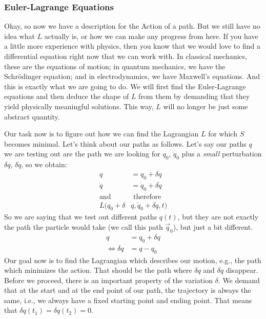 \documentclass{article}
\begin{document}
	\subsubsection{Euler-Lagrange Equations}
	Okay, so now we have a description for the Action of a path. But we still have no idea what $L$ actually is, or how we can make any progress from here. If you have a little more experience with physics, then you know that we would love to find a differential equation right now that we can work with. In classical mechanics, these are the equations of motion; in quantum mechanics, we have the Schrödinger equation; and in electrodynamics, we have Maxwell's equations. And this is exactly what we are going to do. We will first find the Euler-Lagrange equations and then deduce the shape of $L$ from them by demanding that they yield physically meaningful solutions. This way, $L$ will no longer be just some abstract quantity.
	
	Our task now is to figure out how we can find the Lagrangian $L$ for which $S$ becomes minimal. 
	Let's think about our paths as follows. Let's say our paths $q$ we are testing out are the path we are looking for $q_0$, $\dot{q}_0$ plus a \textit{small} perturbation $\delta q$, $\delta \dot{q}$, so we obtain:
	\begin{align}
		q &= q_0 + \delta q\\
		\dot{q} &= \dot{q}_0+\delta \dot{q}\\
		\text{and}&\text{ therefore}\\
		L(q_0+\delta& q, \dot{q}_0 + \delta \dot{q}, t)
	\end{align} 
	So we are saying that we test out different paths $q(t)$, but they are not exactly the path the particle would take (we call this path $\vec{q}_0$), but just a bit different.    
	\begin{align}
		q &= q_0 + \delta q\\
		\Leftrightarrow\delta q &= q - q_0
	\end{align}
	Our goal now is to find the Lagrangian which describes our motion, e.g., the path which minimizes the action. That should be the path where $\delta q$ and $\delta \dot{q}$ disappear.
	Before we proceed, there is an important property of the variation $\delta$. We demand that at the start and at the end point of our path, the trajectory is always the same, i.e., we always have a fixed starting point and ending point. That means that $\delta q(t_1) = \delta q(t_2) = 0$.    
	
\end{document}
